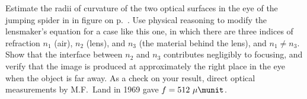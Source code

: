 Estimate the radii of curvature of the two optical surfaces in the eye of the jumping spider in
in figure  on p.~\pageref{fig:jumping-spider}.
Use physical reasoning to modify the lensmaker's equation for a case like this one, in which there
are three indices of refraction $n_1$ (air), $n_2$ (lens), and $n_3$ (the material behind the lens),
and $n_1 \ne n_3$. Show that the interface between $n_2$ and $n_3$ contributes negligibly to
focusing, and verify that the image is produced at approximately the right place in the eye
when the object is far away. As a check on your result, direct optical measurements by M.F.~Land
in 1969 gave $f=512\ \mu\munit$.\answercheck
